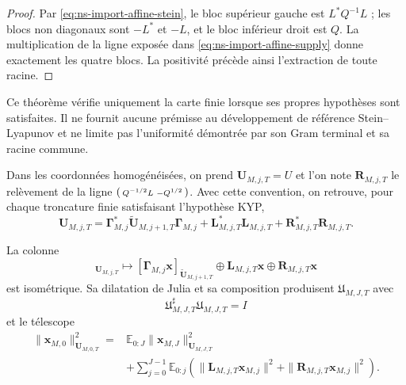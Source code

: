 \begin{proof}
Par \eqref{eq:ns-import-affine-stein}, le bloc supérieur gauche est \(L^*Q^{-1}L\) ; les blocs non diagonaux sont \(-L^*\) et \(-L\), et le bloc inférieur droit est \(Q\). La multiplication de la ligne exposée dans \eqref{eq:ns-import-affine-supply} donne exactement les quatre blocs. La positivité précède ainsi l'extraction de toute racine.
\end{proof}

Ce théorème vérifie uniquement la carte finie lorsque ses propres hypothèses sont satisfaites. Il ne fournit aucune prémisse au développement de référence Stein--Lyapunov et ne limite pas l'uniformité démontrée par son Gram terminal et sa racine commune.

Dans les coordonnées homogénéisées, on prend \(\mathbf U_{M,j,T}=U\) et l'on note \(\mathbf R_{M,j,T}\) le relèvement de la ligne \(\begin{psmallmatrix}Q^{-1/2}L&-Q^{1/2}\end{psmallmatrix}\).
Avec cette convention, on retrouve, pour chaque troncature finie satisfaisant l'hypothèse KYP,
\[
 \mathbf U_{M,j,T}
 =\mathbf\Gamma_{M,j}^*\widetilde{\mathbf U}_{M,j+1,T}
  \mathbf\Gamma_{M,j}
 +\mathbf L_{M,j,T}^*\mathbf L_{M,j,T}
 +\mathbf R_{M,j,T}^*\mathbf R_{M,j,T}.
\]

La colonne
\begin{equation}
 [\mathbf x]_{\mathbf U_{M,j,T}}
 \longmapsto
 [\mathbf\Gamma_{M,j}\mathbf x]_{
  \widetilde{\mathbf U}_{M,j+1,T}}
 \oplus\mathbf L_{M,j,T}\mathbf x
 \oplus\mathbf R_{M,j,T}\mathbf x
 \label{eq:ns-import-local-isometry}
\end{equation}
est isométrique. Sa dilatation de Julia et sa composition produisent \(\mathfrak U_{M,J,T}\) avec
\begin{equation}
 \mathfrak U_{M,J,T}^{\sharp}\mathfrak U_{M,J,T}=I
 \label{eq:ns-import-cascade-isometry}
\end{equation}
et le télescope
\begin{equation}
 \begin{aligned}
 \|\mathbf x_{M,0}\|_{\mathbf U_{M,0,T}}^2
 ={}&\mathbb E_{0:J}
 \|\mathbf x_{M,J}\|_{\mathbf U_{M,J,T}}^2\\
 &+\sum_{j=0}^{J-1}\mathbb E_{0:j}
 \left(\|\mathbf L_{M,j,T}\mathbf x_{M,j}\|^2
       +\|\mathbf R_{M,j,T}\mathbf x_{M,j}\|^2\right).
 \end{aligned}
 \label{eq:ns-import-stein-telescope}
\end{equation}

